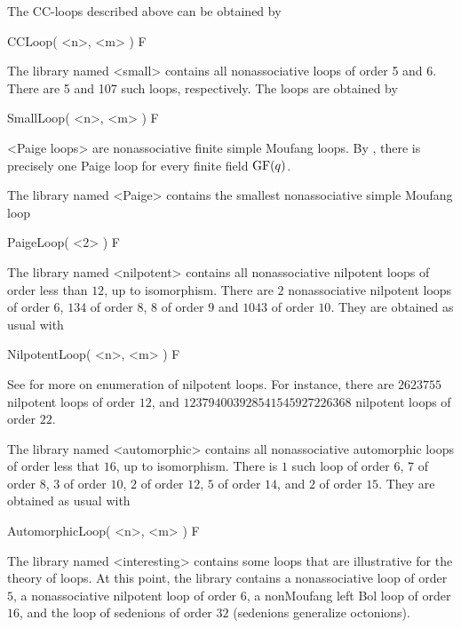 The CC-loops described above can be obtained by

\>CCLoop( <n>, <m> ) F


The library named <small> contains all nonassociative loops of order 5 and 6.
There are 5 and 107 such loops, respectively. The loops are obtained by

\>SmallLoop( <n>, <m> ) F


<Paige loops> are nonassociative finite
simple Moufang loops. By \cite{Li}, there is precisely one Paige loop for every
finite field ${\rm{GF}}(q)$.

The library named <Paige> contains the smallest nonassociative simple Moufang
loop

\>PaigeLoop( <2> ) F


The library named <nilpotent> contains all nonassociative nilpotent loops of
order less than $12$, up to isomorphism. There are $2$ nonassociative nilpotent
loops of order $6$, $134$ of order $8$, $8$ of order $9$ and $1043$ of order
$10$. They are obtained as usual with

\>NilpotentLoop( <n>, <m> ) F

See \cite{DaVo} for more on enumeration of nilpotent loops. For instance, there
are $2623755$ nilpotent loops of order $12$, and $123794003928541545927226368$
nilpotent loops of order $22$.


The library named <automorphic> contains all nonassociative automorphic loops of order
less that $16$, up to isomorphism. There is $1$ such loop of order $6$, $7$ of
order $8$, $3$ of order $10$, $2$ of order $12$, $5$ of order $14$, and $2$ of order $15$.
They are obtained as usual with

\>AutomorphicLoop( <n>, <m> ) F


The library named <interesting> contains some loops that are illustrative for
the theory of loops. At this point, the library contains a nonassociative loop
of order $5$, a nonassociative nilpotent loop of order $6$, a nonMoufang left
Bol loop of order $16$, and the loop of sedenions of order $32$ (sedenions generalize octonions).

